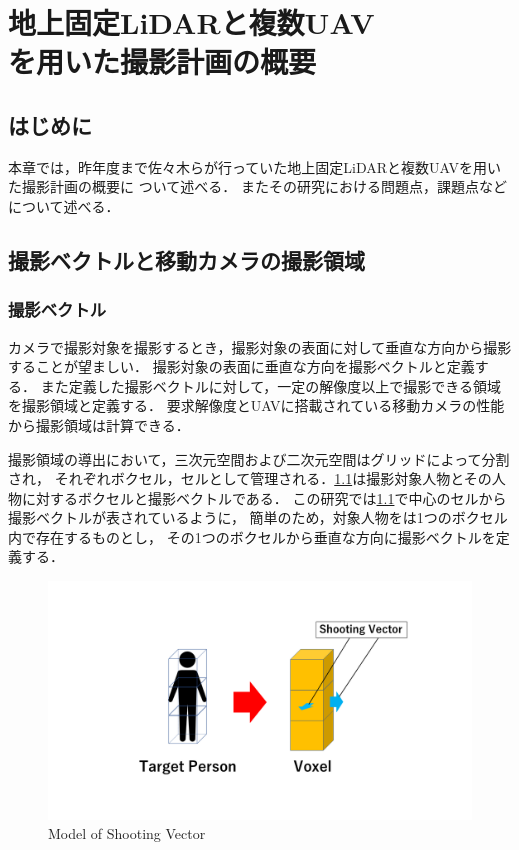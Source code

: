 \documentclass[autodetect-engine,dvipdfmx-if-dvi,ja=standard,a4j,jbase=11pt,magstyle=nomag*]{bxjsreport}
\begin{document}
\chapter[地上固定LiDARと複数UAVを用いた撮影計画の概要]{地上固定LiDARと複数UAV\\を用いた撮影計画の概要}

\section{はじめに}
本章では，昨年度まで佐々木らが行っていた地上固定LiDARと複数UAVを用いた撮影計画の概要に
ついて述べる．\cite{sasaki_2019}
またその研究における問題点，課題点などについて述べる．

\section{撮影ベクトルと移動カメラの撮影領域}
\subsection{撮影ベクトル}
カメラで撮影対象を撮影するとき，撮影対象の表面に対して垂直な方向から撮影することが望ましい．
撮影対象の表面に垂直な方向を撮影ベクトルと定義する．
また定義した撮影ベクトルに対して，一定の解像度以上で撮影できる領域を撮影領域と定義する．
要求解像度とUAVに搭載されている移動カメラの性能から撮影領域は計算できる．

撮影領域の導出において，三次元空間および二次元空間はグリッドによって分割され，
それぞれボクセル，セルとして管理される．\cref{fig:voxel}は撮影対象人物とその人物に対するボクセルと撮影ベクトルである．
この研究では\cref{fig:voxel}で中心のセルから撮影ベクトルが表されているように，
簡単のため，対象人物をは1つのボクセル内で存在するものとし，
その1つのボクセルから垂直な方向に撮影ベクトルを定義する．

\begin{figure}[t]
    \centering
    \includegraphics[width=\linewidth, clip]{./figure/chapter2/voxel.png}
    \caption{Model of Shooting Vector}
    \label{fig:voxel}
\end{figure}
\end{document}
